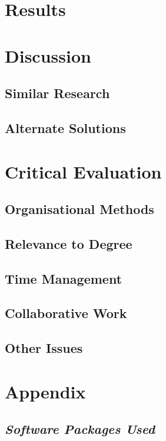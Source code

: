 \documentclass[11pt]{report}
\begin{document}
\chapter{Results}
\label{sec:orgb2e2092}
\chapter{Discussion}
\label{sec:orgbe4077b}
\section{Similar Research}
\label{sec:orgb8e3d7d}
\section{Alternate Solutions}
\label{sec:org99fd3a3}
\chapter{Critical Evaluation}
\label{sec:org5d18240}
\section{Organisational Methods}
\label{sec:org4dff8a7}
\section{Relevance to Degree}
\label{sec:orgaba5251}
\section{Time Management}
\label{sec:orgbb480ba}
\section{Collaborative Work}
\label{sec:org3ce9eb0}
\section{Other Issues}
\label{sec:org0b6e742}
\chapter{Appendix}
\label{sec:orga8c2da1}
\section{\emph{Software Packages Used}}
\label{sec:org808430f}
\end{document}
